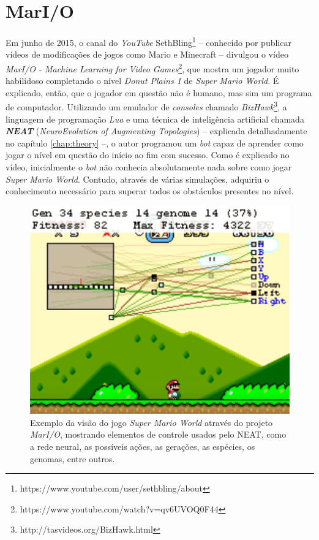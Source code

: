 \section{MarI/O}
Em junho de 2015, o canal do \textit{YouTube}
SethBling\footnote{https://www.youtube.com/user/sethbling/about} -- conhecido
por publicar vídeos de modificações de jogos como Mario e Minecraft -- divulgou
o vídeo \textit{MarI/O - Machine Learning for Video
Games}\footnote{https://www.youtube.com/watch?v=qv6UVOQ0F44}, que mostra um
jogador muito habilidoso completando o nível \textit{Donut Plains 1} de
\textit{Super Mario World}. É explicado, então, que o jogador em questão não é
humano, mas sim um programa de computador. Utilizando um emulador de
\textit{consoles} chamado
\textit{BizHawk}\footnote{http://tasvideos.org/BizHawk.html}, a linguagem de
programação \textit{Lua} e uma técnica de inteligência artificial chamada
\textit{\textbf{NEAT}} (\textit{NeuroEvolution of Augmenting Topologies})
\cite{stanley:ec02} -- explicada detalhadamente no capítulo \ref{chap:theory}
--, o autor programou um \textit{bot} capaz de aprender como jogar o nível em
questão do início ao fim com sucesso. Como é explicado no vídeo, inicialmente o
\textit{bot} não conhecia absolutamente nada sobre como jogar \textit{Super
Mario World}. Contudo, através de várias simulações, adquiriu o conhecimento
necessário para superar todos os obstáculos presentes no nível.

\begin{figure}[htb!]
\centering
\includegraphics[width=.65\textwidth]{fig/mar-io-example.pdf}
\caption{\label{fig:mar-io-example}Exemplo da visão do jogo \textit{Super
Mario World} através do projeto \textit{MarI/O}, mostrando elementos de
controle usados pelo NEAT, como a rede neural, as possíveis ações, as
gerações, as espécies, os genomas, entre outros.}
\end{figure}

